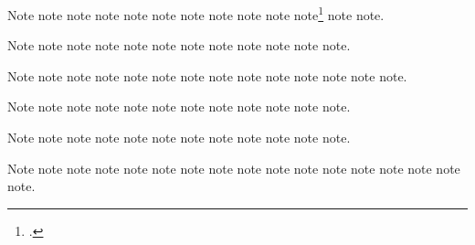 \documentclass[a4paper,12pt]{report}
\begin{document}
Note\autocite{ellis:blog} note\autocite{emerson:nature}
note note\autocite{dunn:revolutions}
note\autocite{eliot:pound} note\autocite{euripides:orestes}
note\autocite{ellet:galena} note\autocite{ellis:blog}
note\autocite{emerson:nature} note\autocite{evanston:library}
note\footnote{.}
note\autocite{floyd:atom} note\autocite{euripides:orestes}.

Note\autocite{frede:inproc} note\autocite{friedman:learning}
note\autocite{evanston:library} note\autocite{feydeau:farces}
note\autocite{floyd:atom} note\autocite{frede:inproc}
note\autocite{friedman:learning} note\autocite{friends:leia}
note\autocite{furet:passing:eng} note\autocite{garaud:gatine}
note\autocite{garrett} note\autocite{gibbard}.

Note\autocite{friends:leia} note\autocite{furet:passing:eng}
note\autocite{garrett} note\autocite{good:wholeissue}
note\autocite{gourmet:052006} note\autocite{garaud:gatine}
note\autocite{greek:filmstrip} note\autocite{grove:sibelius}
note\autocite{handel:messiah} note\autocite{harley:cartography}
note\autocite{harley:ancient:cart} note\autocite{harwood:biden}
note\autocite{gibbard} note\autocite{hitchcock:nbynw}.

Note\autocite{good:wholeissue} note\autocite{hlatky:hrt}
note\autocite{greek:filmstrip} note\autocite{gourmet:052006}
note\autocite{handel:messiah} note\autocite{harwood:biden}
note\autocite[Sibelius, Jean]{grove:sibelius}
note\autocite{hitchcock:nbynw} note\autocite{holiday:fool}
note\autocite{horsley:prosodies} note\autocite{harley:cartography}
note\autocite{horowitz:youtube}.

Note\autocite{harley:ancient:cart}
note\autocite{jackson:paulina:letter} note\autocite{hlatky:hrt}
note\autocite{james:ambassadors} note\autocite{holiday:fool}
note\autocite{horowitz:youtube} note\autocite{horsley:prosodies}
note\autocite{keating:dearborn} note\autocite{jackson:paulina:letter}
note\autocite{kern} note\autocite{james:ambassadors}
note\autocite{kimluu:diethyl}.

Note\autocite{keating:dearborn} note\autocite{kozinn:review}
note\autocite{kern} note\autocite{lach:asia}
note\autocite{kimluu:diethyl} note\autocite{lakeforester:pushcarts}
note\autocite{kozinn:review} note\autocite{levistrauss:savage}
note\autocite{lach:asia} note\autocite{leo:madonna}
note\autocite{lewis} note\autocite{lakeforester:pushcarts}
note\autocite{levistrauss:savage} note\autocite{lecarre:quest}
note\autocite[29]{lewis} note\autocite{lecarre:quest}
note\autocite{lippincott:chicago}.
\end{document}
